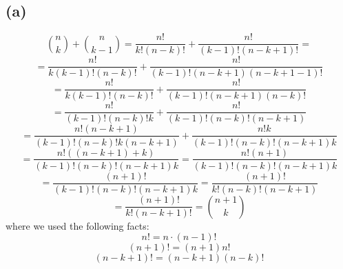 \documentclass{article}
\begin{document}
\subsection*{(a)}
\begin{equation*}
    \binom{n}{k} + \binom{n}{k-1} = \frac{n!}{k!(n-k)!} + \frac{n!}{(k-1)! (n - k + 1)!} =
\end{equation*}
\begin{equation*}
    = \frac{n!}{k(k-1)!(n-k)!} + \frac{n!}{(k-1)! (n - k + 1)(n - k + 1 - 1)!}
\end{equation*}
\begin{equation*}
    = \frac{n!}{k(k-1)!(n-k)!} + \frac{n!}{(k-1)! (n - k + 1)(n - k)!}
\end{equation*}
\begin{equation*}
    = \frac{n!}{(k-1)!(n-k)!k} + \frac{n!}{(k-1)!(n - k)!(n - k + 1)}
\end{equation*}
\begin{equation*}
    = \frac{n!(n-k+1)}{(k-1)!(n-k)!k(n-k+1)} + \frac{n!k}{(k-1)!(n - k)!(n - k + 1)k}
\end{equation*}
\begin{equation*}
    = \frac{n! ((n - k + 1) + k)}{(k-1)!(n - k)!(n - k + 1)k} = \frac{n!(n+1)}{(k-1)!(n - k)!(n - k + 1)k}
\end{equation*}
\begin{equation*}
    = \frac{(n+1)!}{(k-1)!(n - k)!(n - k + 1)k} = \frac{(n+1)!}{k!(n - k)!(n - k + 1)}
\end{equation*}
\begin{equation*}
    = \frac{(n+1)!}{k!(n - k + 1)!} = \binom{n+1}{k}
\end{equation*}
where we used the following facts:
\begin{equation*}
    n! = n \cdot (n-1)!
\end{equation*}
\begin{equation*}
    (n+1)! = (n+1)n!
\end{equation*}
\begin{equation*}
    (n -k + 1)! = (n - k + 1)(n-k)!
\end{equation*}
\end{document}
